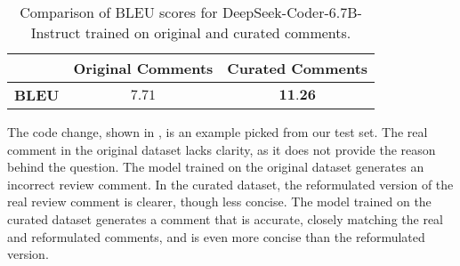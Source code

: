 
\begin{table}[!t]
\centering
\caption{Comparison of BLEU scores for DeepSeek-Coder-6.7B-Instruct trained on original and curated comments.}
\label{tab:com_results}
\begin{tabular}{@{}lcc@{}}
\toprule
& \textbf{Original Comments} & \textbf{Curated Comments} \\ 
\midrule
\textbf{BLEU} & $7.71$ & $\textbf{11.26}$ \\ 
\bottomrule
\end{tabular}
\vspace{-1em}
\end{table}



The code change, shown in , is an example picked from our test set. The real comment in the original dataset lacks clarity, as it does not provide the reason behind the question. The model trained on the original dataset generates an incorrect review comment. In the curated dataset, the reformulated version of the real review comment is clearer, though less concise. The model trained on the curated dataset generates a comment that is accurate, closely matching the real and reformulated comments, and is even more concise than the reformulated version.



